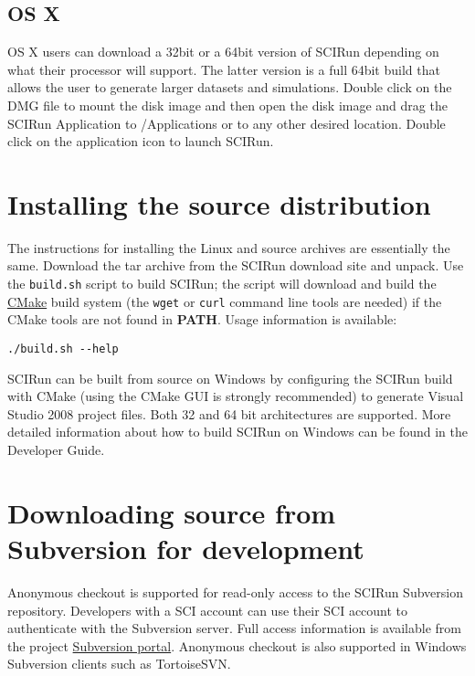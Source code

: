 \documentclass[fleqn,12pt,openany]{book}
\begin{document}
\subsection{OS X}

OS X users can download a 32bit or a 64bit version of SCIRun depending on what their processor will support.
The latter version is a full 64bit build that allows the user to generate larger datasets and simulations.
Double click on the DMG file to mount the disk image and then open the disk image and drag the SCIRun Application to /Applications or to any other desired location.
Double click on the application icon to launch SCIRun.

\section{Installing the source distribution}

The instructions for installing the Linux and source archives are essentially the same.
Download the tar archive from the SCIRun download site and unpack.
Use the \texttt{build.sh} script to build SCIRun; the script will download and build the
\href{http://www.cmake.org}{CMake} build system (the \texttt{wget} or \texttt{curl} command line tools are needed)
if the CMake tools are not found in \textbf{PATH}.
Usage information is available:
\begin{verbatim}
./build.sh --help
\end{verbatim}

SCIRun can be built from source on Windows by configuring the SCIRun build with CMake (using the
CMake GUI is strongly recommended) to generate Visual Studio 2008 project files.
Both 32 and 64 bit architectures are supported.
More detailed information about how to build SCIRun on Windows can be found in the Developer Guide.

\section{Downloading source from Subversion for development}\label{dev}

Anonymous checkout is supported for read-only access to the SCIRun Subversion repository.
Developers with a SCI account can use their SCI account to authenticate with the Subversion server.
Full access information is available from the project
\href{https://code.sci.utah.edu/gf/project/cibc/scmsvn/?action=AccessInfo}{Subversion portal}.
Anonymous checkout is also supported in Windows Subversion clients such as TortoiseSVN.
\end{document}
